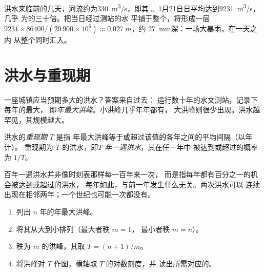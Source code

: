 洪水来临前的几天，河流约为\qty{330}{m^3/s}，即其
。1月21日日平均达到\qty{9231}{m^3/s}，几乎
为的三十倍。把当日经过测站的水
平铺于整个，将形成一层
$9231 \times 86400 / (29\,900 \times 10^6) \approx \qty{0.027}{m}$，约
\qty{27}{mm}深：一场大暴雨，在一天之内
从整个同时汇入。

\section{洪水与重现期}

一座城镇应当预期多大的洪水？答案来自过去：
运行数十年的水文测站，记录下每年的最大，
即\emph{年最大洪峰}。小洪峰几乎年年都有，
大洪峰则很少出现。洪水越罕见，其规模越大。

\begin{definition}[重现期]\label{def:g10:drainage-basins:return-period}
洪水的\emph{重现期} $T$ 是指
年最大洪峰等于或超过该值的各年之间的平均间隔（以年计）。
重现期为 $T$ 的洪水，即\emph{$T$ 年一遇洪水}，其在任一年中
被达到或超过的概率为 $1/T$。
\end{definition}

百年一遇洪水并非像时刻表那样每一百年来一次，
而是指每年都有百分之一的机会被达到或超过的洪水，
每年如此，与前一年发生什么无关。两次洪水可以
连续出现在相邻两年；一个世纪也可能一次都没有。

\begin{method}[由年最大洪峰记录求重现期]\label{met:g10:drainage-basins:return-periods}
\begin{enumerate}
  \item 列出 $n$ 年的年最大洪峰。
  \item 将其从大到小排列（最大者秩 $m = 1$，
        最小者秩 $m = n$）。
  \item 秩为 $m$ 的洪峰，其取 $T = (n + 1)/m$。
  \item 将洪峰对 $T$ 作图，横轴取 $T$ 的对数刻度，并
        读出所需对应的。
\end{enumerate}
\end{method}

